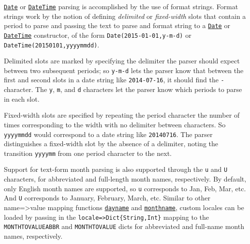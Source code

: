 \hyperlink{4488183467971164548}{\texttt{Date}} or \hyperlink{17572689933274889838}{\texttt{DateTime}} parsing is accomplished by the use of format strings. Format strings work by the notion of defining \emph{delimited} or \emph{fixed-width} {\textquotedbl}slots{\textquotedbl} that contain a period to parse and passing the text to parse and format string to a \hyperlink{4488183467971164548}{\texttt{Date}} or \hyperlink{17572689933274889838}{\texttt{DateTime}} constructor, of the form \texttt{Date({\textquotedbl}2015-01-01{\textquotedbl},{\textquotedbl}y-m-d{\textquotedbl})} or \texttt{DateTime({\textquotedbl}20150101{\textquotedbl},{\textquotedbl}yyyymmdd{\textquotedbl})}.



Delimited slots are marked by specifying the delimiter the parser should expect between two subsequent periods; so \texttt{{\textquotedbl}y-m-d{\textquotedbl}} lets the parser know that between the first and second slots in a date string like \texttt{{\textquotedbl}2014-07-16{\textquotedbl}}, it should find the \texttt{-} character. The \texttt{y}, \texttt{m}, and \texttt{d} characters let the parser know which periods to parse in each slot.



Fixed-width slots are specified by repeating the period character the number of times corresponding to the width with no delimiter between characters. So \texttt{{\textquotedbl}yyyymmdd{\textquotedbl}} would correspond to a date string like \texttt{{\textquotedbl}20140716{\textquotedbl}}. The parser distinguishes a fixed-width slot by the absence of a delimiter, noting the transition \texttt{{\textquotedbl}yyyymm{\textquotedbl}} from one period character to the next.



Support for text-form month parsing is also supported through the \texttt{u} and \texttt{U} characters, for abbreviated and full-length month names, respectively. By default, only English month names are supported, so \texttt{u} corresponds to {\textquotedbl}Jan{\textquotedbl}, {\textquotedbl}Feb{\textquotedbl}, {\textquotedbl}Mar{\textquotedbl}, etc. And \texttt{U} corresponds to {\textquotedbl}January{\textquotedbl}, {\textquotedbl}February{\textquotedbl}, {\textquotedbl}March{\textquotedbl}, etc. Similar to other name=>value mapping functions \hyperlink{2440842966718954493}{\texttt{dayname}} and \hyperlink{16585759639636493546}{\texttt{monthname}}, custom locales can be loaded by passing in the \texttt{locale=>Dict\{String,Int\}} mapping to the \texttt{MONTHTOVALUEABBR} and \texttt{MONTHTOVALUE} dicts for abbreviated and full-name month names, respectively.




